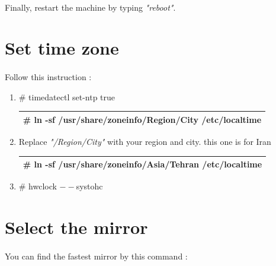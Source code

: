 \documentclass[12pt, a4paper]{article}
\begin{document}
\paragraph{}
Finally, restart the machine by typing \emph{"reboot"}.

\section{Set time zone}
\paragraph{}
Follow this instruction :

\begin{enumerate}
	\item \# timedatectl set-ntp true

\begin{center}
	\begin{tabular}{|c|} \hline
		\# ln -sf /usr/share/zoneinfo/Region/City /etc/localtime\\ \hline
	\end{tabular}
\end{center}
	
	\item Replace \emph{"/Region/City"} with your region and city. this one is for Iran 
	
	\begin{center}
		\begin{tabular}{|c|} \hline
			\# ln -sf /usr/share/zoneinfo/Asia/Tehran /etc/localtime\\ \hline
		\end{tabular}
	\end{center}
	
	\item \# hwclock $--$systohc
\end{enumerate}

\section{Select the mirror}
\paragraph{}
You can find the fastest mirror by this command :

\begin{center}
\end{center}
\end{document}
